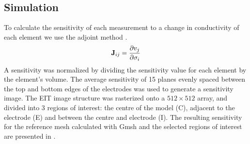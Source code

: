 \subsection{Simulation}

To calculate the sensitivity of each measurement to a change in conductivity of each element
we use the adjoint method \parencite{polydorides_electrode_2002}. 
\begin{equation}
  {\mbox{\bf J}}_{ij}=\frac{\partial v_j}{\partial \sigma_i}
\end{equation}
A sensitivity was normalized by dividing the sensitivity value for each element 
by the element's volume. 
The average sensitivity of 15 planes evenly spaced between the top and bottom edges of the electrodes
was used to generate a sensitivity image.
The EIT image structure was rasterized onto a $512\times512$ array, and divided into 3 regions of interest:
the centre of the model (C), adjacent to the electrode (E) and between the centre and electrode
(I). The resulting sensitivity for the reference mesh calculated with Gmsh and the 
selected regions of interest are presented in .

